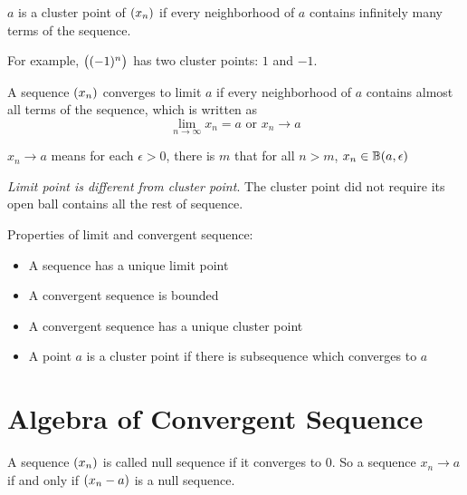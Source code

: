 \begin{definition}
    $a$ is a cluster point of $\sequence{x_n}$ if every neighborhood of $a$ contains infinitely many terms of the sequence.
    
    For example, $\sequence{(-1)^n}$ has two cluster points: $1$ and $-1$.
\end{definition}

\begin{definition}
    A sequence $\sequence{x_n}$ converges to limit $a$ if every neighborhood of $a$ contains almost all terms of the sequence, which is written as
    \begin{equation}
        \lim_{n \rightarrow \infty} x_n = a \text{ or } x_n \rightarrow a
    \end{equation}
    
    $x_n \rightarrow a$ means for each $\epsilon>0$, there is $m$ that for all $n > m$, $x_n \in \mathbb{B}(a, \epsilon)$
\end{definition}

\emph{Limit point is different from cluster point}. The cluster point did not require its open ball contains all the rest of sequence.


\begin{theorem}\label{property_of_limit}
    Properties of limit and convergent sequence:
    \begin{itemize}
        \item A sequence has a unique limit point
        \item A convergent sequence is bounded
        \item A convergent sequence has a unique cluster point
        \item A point $a$ is a cluster point if there is subsequence which converges to $a$
    \end{itemize}
\end{theorem}





%
%
%
%

\section{Algebra of Convergent Sequence}

\begin{definition}
    A sequence $\sequence{x_n}$ is called null sequence if it converges to $0$. So a sequence $x_n \rightarrow a$ if and only if $\sequence{x_n - a}$ is a null sequence.
\end{definition}

